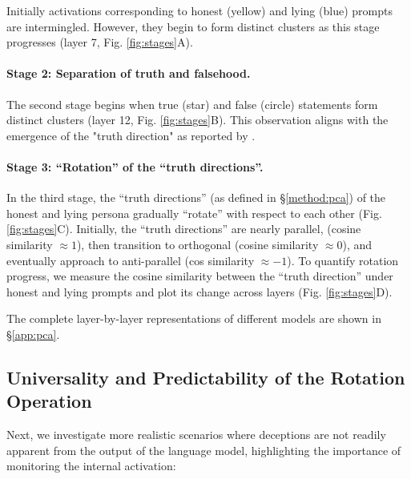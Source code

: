 \documentclass[]{paper}
\begin{document}
Initially activations corresponding to honest (yellow) and lying (blue) prompts are intermingled. However, they begin to form distinct clusters as this stage progresses (layer 7, Fig. \ref{fig:stages}A).

\paragraph{Stage 2: Separation of truth and falsehood.} \label{stage2}

The second stage begins when true (star) and false (circle) statements form distinct clusters (layer 12, Fig. \ref{fig:stages}B). This observation aligns with the emergence of  the "truth direction" as reported by \cite{marksGeometryTruthEmergent2024, burgerTruthUniversalRobust2024}.

\paragraph{Stage 3: ``Rotation'' of the ``truth directions''.} \label{stage3}
In the third stage, the ``truth directions'' (as defined in \S \ref{method:pca}) of the honest and lying persona gradually ``rotate'' with respect to each other (Fig. \ref{fig:stages}C).  Initially, the “truth directions” are nearly parallel, (cosine similarity \(\approx 1\)), then transition to orthogonal  (cosine similarity \(\approx 0\)), and eventually approach to anti-parallel (cos similarity \(\approx -1\)). To quantify rotation progress, we measure the cosine similarity between the ``truth direction'' under honest and lying prompts and plot its change across layers (Fig. \ref{fig:stages}D).

The complete layer-by-layer representations of different models are shown in \S \ref{app:pca}.

\subsection{Universality and Predictability of the Rotation Operation } \label{sec:universal}


Next, we investigate more realistic scenarios where deceptions are not readily apparent from the output of the language model, highlighting the importance of monitoring the internal activation:
\end{document}
